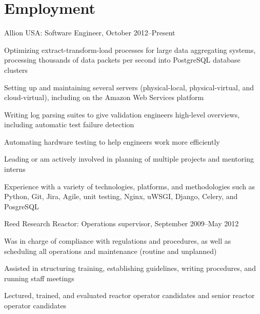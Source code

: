 \documentclass[letterpaper]{article}
\renewenvironment{itemize}{\begin{list}{}{\setlength{\leftmargin}{1.5em}}}{\end{list}}%
\begin{document}
\section*{Employment}%

\begin{itemize}
\item Allion USA: Software Engineer, October 2012--Present
	\begin{itemize}
    \item Optimizing extract-transform-load processes for large data aggregating systems, processing thousands of data packets per second into PostgreSQL database clusters
    \item Setting up and maintaining several servers (physical-local, physical-virtual, and cloud-virtual), including on the Amazon Web Services platform%
    \item Writing log parsing suites to give validation engineers high-level overviews, including automatic test failure detection
    \item Automating hardware testing to help engineers work more efficiently 
    \item Leading or am actively involved in planning of multiple projects and mentoring interns
    \item Experience with a variety of technologies, platforms, and methodologies such as Python, Git, Jira, Agile, unit testing, Nginx, uWSGI, Django, Celery, and PosgreSQL 
	\end{itemize}
\item Reed Research Reactor: Operations supervisor, September 2009--May 2012
	\begin{itemize}
	\item Was in charge of compliance with regulations and procedures, as well as scheduling all operations and maintenance (routine and unplanned)
	\item Assisted in structuring training, establishing guidelines, writing procedures, and running staff meetings
	\item Lectured, trained, and evaluated reactor operator candidates and senior reactor operator candidates

\end{itemize}
\end{itemize}
\end{document}
